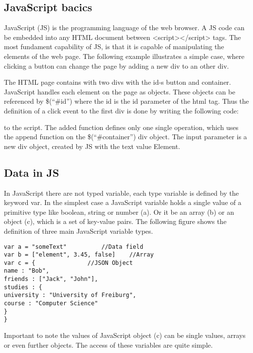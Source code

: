 \subsection{JavaScript bacics}

JavaScript (JS) is the programming language of the web browser. A JS code can be embedded into any HTML document between <script></script> tags. The most fundament capability of JS, is that it is capable of manipulating the elements of the web page. The following example illustrates a simple case, where clicking a button can change the page by adding a new div to an other div.


The HTML page contains with two divs with the id-s button and container. JavaScript handles each element on the page as objects. These objects can be referenced by \$(“\#id”) where the id is the id parameter of the html tag. Thus the definition of a click event to the first div is done by writing the following code:


to the script. The added function defines only one single operation, which uses the append function on the \$(“\#container”) div object. The input parameter is a new div object, created by JS with the text value Element. 


\subsection{Data in JS}

In JavaScript there are not typed variable, each type variable is defined by the keyword var. In the simplest case a JavaScript variable holds a single value of a  primitive type like boolean, string or number (a). Or it be an array (b) or an object (c), which is a set of key-value pairs. The following figure shows the definition of three main JavaScript variable types.


\begin{lstlisting}[basicstyle=\footnotesize, frame=single, caption={JavaScript data types}, captionpos=b]
var a = "someText"			//Data field
var b = ["element", 3.45, false]	//Array
var c = {				//JSON Object
name : "Bob",
friends : ["Jack", "John"],
studies : {
university : "University of Freiburg",
course : "Computer Science"
}		
}
\end{lstlisting}

Important to note the values of JavaScript object (c) can be single values, arrays or even further objects. The access of these variables are quite simple.

